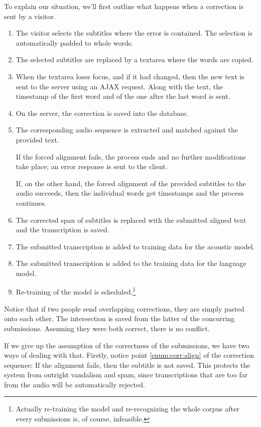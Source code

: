 \documentclass{llncs}
\begin{document}
To explain our situation, we'll first outline what happens when a correction is
sent by a visitor.
\begin{enumerate}
\item{The visitor selects the subtitles where the error is contained. The
selection is automatically padded to whole words.}
\item{The selected subtitles are replaced by a textarea where the words are
copied.}
\item{When the textarea loses focus, and if it had changed, then the new text is
sent to the server using an
AJAX\cite{ajax} request. Along with the text, the timestamp of the first word
and of the one after the last word is sent.}
\item{On the server, the correction is saved into the database.}
\item{The corresponding audio sequence is extracted and matched against the
provided text.

If the forced alignment fails, the process ends
and no further modifications take place; an error response is sent to the
client.

If, on the other hand, the forced alignment of the provided subtitles to
the audio succeeds, then the individual words get timestamps
and the process continues.\label{enum:corr:align}}
\item{The corrected span of subtitles is replaced with the submitted aligned
text and the transcription is saved.}
\item{The submitted transcription is added to training data for the acoustic
model.}
\item{The submitted transcription is added to the training data for the language
model.}
\item{Re-training of the model is scheduled.\footnote{Actually re-training the
model and re-recognizing the whole corpus after every submissions is, of course,
infeasible.}}
\end{enumerate}

Notice that %
if two people
send overlapping corrections, they are simply pasted onto each other. The
intersection is saved from the latter of the concurring submissions.
Assuming they were both correct, there is no conflict.

If we give up the assumption of the correctness of the submissions, we have two
ways of dealing with that. Firstly, notice point \ref{enum:corr:align} of the
correction sequence: If the alignment fails, then the subtitle is not saved.
This protects the system from outright vandalism and spam, since transcriptions
that are too far from the audio will be automatically rejected.
\end{document}
